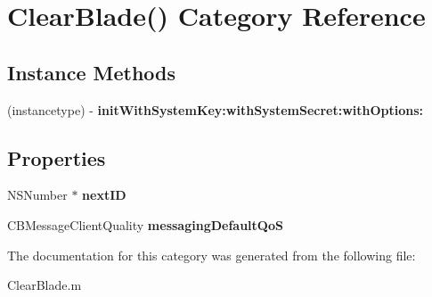 \hypertarget{category_clear_blade_07_08}{\section{Clear\+Blade() Category Reference}
\label{category_clear_blade_07_08}
}
\subsection*{Instance Methods}
\begin{DoxyCompactItemize}
\item 
\hypertarget{category_clear_blade_07_08_a0d43815879fb0a4b769552ac24e08826}{(instancetype) -\/ {\bfseries init\+With\+System\+Key\+:with\+System\+Secret\+:with\+Options\+:}}\label{category_clear_blade_07_08_a0d43815879fb0a4b769552ac24e08826}

\end{DoxyCompactItemize}
\subsection*{Properties}
\begin{DoxyCompactItemize}
\item 
\hypertarget{category_clear_blade_07_08_aaf2f0eda9ee883fbd5e6e152579c9dc9}{N\+S\+Number $\ast$ {\bfseries next\+I\+D}}\label{category_clear_blade_07_08_aaf2f0eda9ee883fbd5e6e152579c9dc9}

\item 
\hypertarget{category_clear_blade_07_08_a88ac8ac01e37d365cbac7227e738bf40}{C\+B\+Message\+Client\+Quality {\bfseries messaging\+Default\+Qo\+S}}\label{category_clear_blade_07_08_a88ac8ac01e37d365cbac7227e738bf40}

\end{DoxyCompactItemize}


The documentation for this category was generated from the following file\+:\begin{DoxyCompactItemize}
\item 
Clear\+Blade.\+m\end{DoxyCompactItemize}
